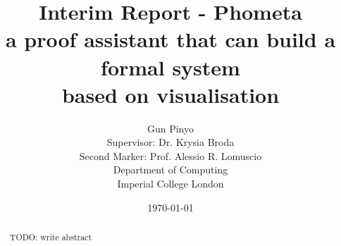 \documentclass[11pt, a4paper]{report}
\title{
    Interim Report - Phometa \\
    a proof assistant that can build a formal system \\
    based on visualisation
}
\author{
    Gun Pinyo \\
    Supervisor: Dr. Krysia Broda\\
    Second Marker: Prof. Alessio R. Lomuscio\\
    Department of Computing \\
    Imperial College London
}
\date{\today}
\begin{document}
\maketitle
\thispagestyle{empty}

\begin{abstract}
TODO: write abstract
\end{abstract}

\tableofcontents







\end{document}
